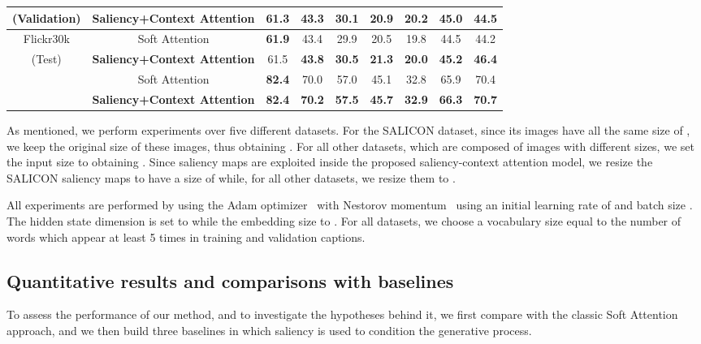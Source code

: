 \begin{table}[t]
\begin{center}
\begin{small}
\begin{tabular}{|c|c|ccccccc|}
    \footnotesize{(Validation)} & \footnotesize{\textbf{Saliency+Context Attention}}  & 61.3  & \textbf{43.3}  & \textbf{30.1} & \textbf{20.9} & \textbf{20.2} &	\textbf{45.0} & \textbf{44.5} \\ \hline
    \footnotesize{Flickr30k} & \footnotesize{Soft Attention} & \textbf{61.9} & 43.4 & 29.9 & 20.5 &	19.8 & 44.5 & 44.2 \\ 
    \footnotesize{(Test)}  & \footnotesize{\textbf{Saliency+Context Attention}} & 61.5 &	\textbf{43.8}  & \textbf{30.5} & \textbf{21.3} &  \textbf{20.0}  & \textbf{45.2} & \textbf{46.4}  \\ \hline
    \footnotesize{\multirow{2}{*}{PASCAL-50S}} & \footnotesize{Soft Attention}  & \textbf{82.4} & 70.0 & 57.0 & 45.1 & 32.8 & 65.9 & 70.4 \\
    & \footnotesize{\textbf{Saliency+Context Attention}} & \textbf{82.4} & \textbf{70.2} & \textbf{57.5} & \textbf{45.7} & \textbf{32.9} & \textbf{66.3} & \textbf{70.7} \\ \hline 
    \end{tabular}
    \end{small}
    \end{center}
\end{table}

As mentioned, we perform experiments over five different datasets. For the SALICON dataset, since its images have all the same size of , we keep the original size of these images, thus obtaining . For all other datasets, which are composed of images with different sizes, we set the input size to  obtaining . Since saliency maps are exploited inside the proposed saliency-context attention model, we resize the SALICON saliency maps to have a size of  while, for all other datasets, we resize them to .

All experiments are performed by using the Adam optimizer~\cite{kingma2014adam} with Nestorov momentum~\cite{sutskever2013importance} using an initial learning rate of  and batch size . The hidden state dimension is set to  while the embedding size to . For all datasets, we choose a vocabulary size equal to the number of words which appear at least 5 times in training and validation captions.

\subsection{Quantitative results and comparisons with baselines}
To assess the performance of our method, and to investigate the hypotheses behind it, we first compare with the classic Soft Attention approach, and we then build three baselines in which saliency is used to condition the generative process.

